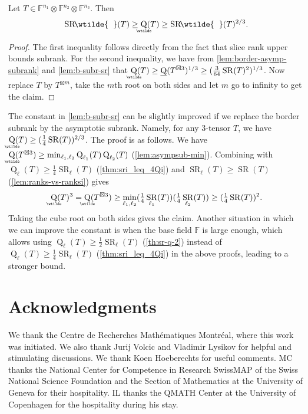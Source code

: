 \documentclass{daj}
\DeclareMathOperator{\subrank}{Q}
\DeclareMathOperator{\slicerank}{SR}
\DeclareMathOperator{\asympsubrank}{\underaccent{\wtilde}{Q}}
\DeclareMathOperator{\asympslicerank}{\underaccent{\wtilde}{SR}}
\DeclareMathOperator{\asympsupslicerank}{{SR}\!\wtilde{\phantom{X}\!\!}}
\DeclareMathOperator{\bordersubrank}{\underline{Q}}
\newcommand{\FF}{\mathbb{F}}
\begin{document}
\begin{theorem}
\label{th:q-sr-bound}
Let $T \in \FF^{n_1} \otimes \FF^{n_2} \otimes \FF^{n_3}$. Then
\[
\asympsupslicerank(T) \geq \asympsubrank(T) \geq \asympsupslicerank(T)^{2/3}.
\]
\end{theorem}
\begin{proof}
The first inequality follows directly from the fact that slice rank upper bounds subrank. For the second inequality, we have from \autoref{lem:border-asymp-subrank} and \autoref{lem:b-subr-sr} that $\asympsubrank(T) \geq \bordersubrank(T^{\boxtimes 3})^{1/3} \geq (\tfrac{3}{64}\slicerank(T)^2)^{1/3}$. Now replace $T$ by $T^{\boxtimes m}$, take the $m$th root on both sides and let $m$ go to infinity to get the claim.
\end{proof}

\begin{remark}\label{th:a-subr-sr}
 The constant in \autoref{lem:b-subr-sr} can be slightly improved if we replace the border subrank by the asymptotic subrank.
 Namely, for any $3$-tensor $T$, we have $\asympsubrank(T) \geq (\frac{1}{4} \slicerank(T))^{2/3}$.
 The proof is as follows.
 We have
    $\asympsubrank(T^{\boxtimes 3}) \geq \min_{{\ell_1},{\ell_2}} \subrank_{\ell_1}(T) \subrank_{\ell_2}(T)$ (\autoref{lem:asympsub-min}). Combining with $\subrank_\ell(T) \geq \tfrac14 \slicerank_\ell(T)$ (\autoref{thm:sri_leq_4Qi}) and $\slicerank_\ell(T) \geq \slicerank(T)$ (\autoref{lem:ranks-vs-ranksi}) gives
    \[
    \asympsubrank(T)^3 = \asympsubrank(T^{\boxtimes 3}) \geq \min_{{\ell_1},{\ell_2}} (\tfrac14\slicerank_{\ell_1}(T)) (\tfrac14\slicerank_{\ell_2}(T)) \geq (\tfrac14\slicerank(T))^2.
    \]
    Taking the cube root on both sides gives the claim. Another situation in which we can improve the constant is when the base field $\FF$ is large enough, which allows using $\subrank_\ell(T) \geq \tfrac12 \slicerank_\ell(T)$ (\autoref{th:sr-q-2}) instead of $\subrank_\ell(T) \geq \tfrac14 \slicerank_\ell(T)$ (\autoref{thm:sri_leq_4Qi}) in the above proofs, leading to a stronger bound.
\end{remark}


\section*{Acknowledgments} %
We thank the Centre de Recherches Mathématiques Montréal, where this work was initiated. 
We also thank Jurij Volcic and Vladimir Lysikov for helpful and stimulating discussions. We thank Koen Hoeberechts for useful comments. MC thanks the National Center for Competence in Research SwissMAP of the Swiss National Science Foundation and the Section of Mathematics at the University of Geneva for their hospitality. IL thanks the QMATH Center at the University of Copenhagen for the hospitality during his stay.
\end{document}
